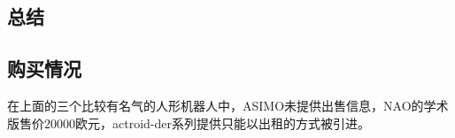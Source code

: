 \documentclass[10pt,a4paper]{article}
\begin{document}
\begin{CJK*}{UTF8}{gkai}
\section{总结}
\subsection{购买情况}
在上面的三个比较有名气的人形机器人中，ASIMO未提供出售信息，NAO的学术版售价20000欧元，actroid-der系列提供只能以出租的方式被引进。


		
		

\clearpage     
\end{CJK*}
\end{document}
